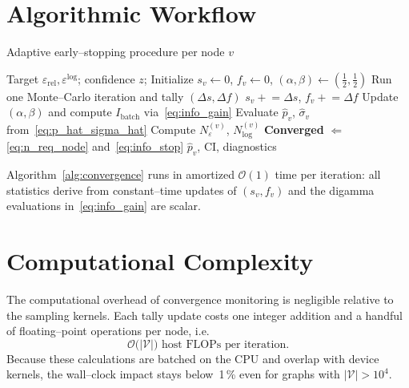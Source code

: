 \section{Algorithmic Workflow}
\label{subsec:workflow}

\begin{algorithm}[H]
  \caption{Adaptive early--stopping procedure per node $v$}
  \label{alg:convergence}
  \begin{algorithmic}[1]
    \Require Target $\varepsilon_{\mathrm{rel}},\varepsilon^{\log}$; confidence $z$; \vspace{1pt}
    \State Initialize $s_v\gets 0$, $f_v\gets 0$, $(\alpha,\beta)\gets(\tfrac12,\tfrac12)$
      \State Run one Monte--Carlo iteration and tally $(\Delta s,\Delta f)$
      \State $s_v\mathrel{+}=\Delta s$, \quad $f_v\mathrel{+}=\Delta f$
      \State Update $(\alpha,\beta)$ and compute $I_{\text{batch}}$ via~\eqref{eq:info_gain}
      \State Evaluate $\widehat{p}_v$, $\widehat{\sigma}_v$ from~\eqref{eq:p_hat_sigma_hat}
      \State Compute $N_{\varepsilon}^{(v)}$, $N^{(v)}_{\log}$
      \State \textbf{Converged} $\Leftarrow$ \eqref{eq:n_req_node} and~\eqref{eq:info_stop}
    \EndWhile
    \State \Return $\widehat{p}_v$, CI, diagnostics
  \end{algorithmic}
\end{algorithm}
Algorithm~\ref{alg:convergence} runs in amortized $\mathcal{O}(1)$ time per
iteration: all statistics derive from constant--time updates of $(s_v,f_v)$
and the digamma evaluations in~\eqref{eq:info_gain} are scalar.

\section{Computational Complexity}
\label{subsec:conv_complexity}

The computational overhead of convergence monitoring is negligible relative to
the sampling kernels.  Each tally update costs one integer addition and a
handful of floating--point operations per node, i.e.
\begin{equation}
  \mathcal{O}\bigl(|\mathcal{V}|\bigr) \text{ host FLOPs per iteration.}
\end{equation}
Because these calculations are batched on the CPU and overlap with device
kernels, the wall--clock impact stays below~1\,\% even for graphs with
$|\mathcal{V}|>10^{4}$.

